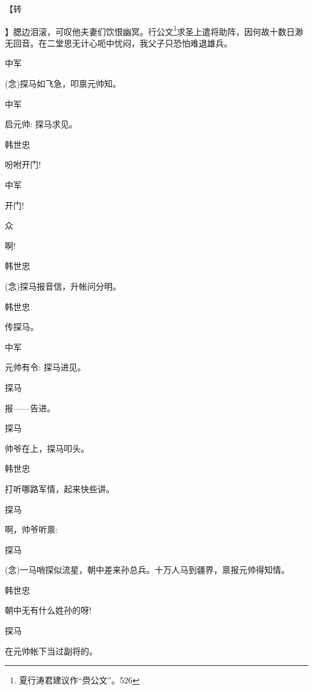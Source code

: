 【{\footnotesize 转}{】腮边泪滚，可叹他夫妻们饮恨幽冥。行公文\footnote{ 夏行涛君建议作``赍公文''。{526}}求圣上遣将助阵，因何故十数日渺无回音。在二堂思无计心呃中忧闷，我父子只恐怕难退雄兵。

中军\hspace{30pt}~

({\akai 念})探马如飞急，叩禀元帅知。

中军\hspace{30pt}~

启元帅: 探马求见。

韩世忠\hspace{20pt}~

吩咐开门!

中军\hspace{30pt}~

开门!

众\hspace{40pt}~

啊!

韩世忠\hspace{20pt}~

{({\akai 念})}探马报音信，升帐问分明。

韩世忠\hspace{20pt}~

传探马。

中军\hspace{30pt}~

元帅有令: 探马进见。

探马\hspace{30pt}~

报------告进。

探马\hspace{30pt}~

帅爷在上，探马叩头。

韩世忠\hspace{20pt}~

打听哪路军情，起来快些讲。

探马\hspace{30pt}~

啊，帅爷听禀: 

探马

({\akai 念})一马哨探似流星，朝中差来孙总兵。十万人马到疆界，禀报元帅得知情。

韩世忠\hspace{20pt}~

朝中无有什么姓孙的呀!

探马\hspace{30pt}~

在元帅帐下当过副将的。

}
